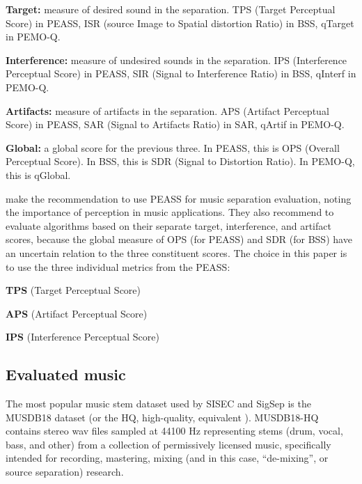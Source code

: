 \documentclass[letter,12pt]{article}
\newenvironment{tight_enumerate}{
\begin{enumerate}
  \setlength{\itemsep}{0pt}
  \setlength{\parskip}{0pt}
}{\end{enumerate}}
\newenvironment{tight_itemize}{
\begin{itemize}
  \setlength{\itemsep}{0pt}
  \setlength{\parskip}{0pt}
}{\end{itemize}}
\begin{document}
\begin{tight_itemize}
\item
	\textbf{Target:} measure of desired sound in the separation. TPS (Target Perceptual Score) in PEASS, ISR (source Image to Spatial distortion Ratio) in BSS, qTarget in PEMO-Q.
\item
	\textbf{Interference:} measure of undesired sounds in the separation. IPS (Interference Perceptual Score) in PEASS, SIR (Signal to Interference Ratio) in BSS, qInterf in PEMO-Q.
\item
	\textbf{Artifacts:} measure of artifacts in the separation. APS (Artifact Perceptual Score) in PEASS, SAR (Signal to Artifacts Ratio) in SAR, qArtif in PEMO-Q.
\item
	\textbf{Global:} a global score for the previous three. In PEASS, this is OPS (Overall Perceptual Score). In BSS, this is SDR (Signal to Distortion Ratio). In PEMO-Q, this is qGlobal.
\end{tight_itemize}

\citet{beassvpeass} make the recommendation to use PEASS for music separation evaluation, noting the importance of perception in music applications. They also recommend to evaluate algorithms based on their separate target, interference, and artifact scores, because the global measure of OPS (for PEASS) and SDR (for BSS) have an uncertain relation to the three constituent scores. The choice in this paper is to use the three individual metrics from the PEASS:
\begin{tight_enumerate}
	\item
		\textbf{TPS} (Target Perceptual Score)
	\item
		\textbf{APS} (Artifact Perceptual Score)
	\item
		\textbf{IPS} (Interference Perceptual Score)
\end{tight_enumerate}

\subsection{Evaluated music}

The most popular music stem dataset used by SISEC and SigSep is the MUSDB18 dataset \cite{musdb18} (or the HQ, high-quality, equivalent \cite{musdb18-hq}). MUSDB18-HQ contains stereo wav files sampled at 44100 Hz representing stems (drum, vocal, bass, and other) from a collection of permissively licensed music, specifically intended for recording, mastering, mixing (and in this case, ``de-mixing'', or source separation) research. 
\end{document}
